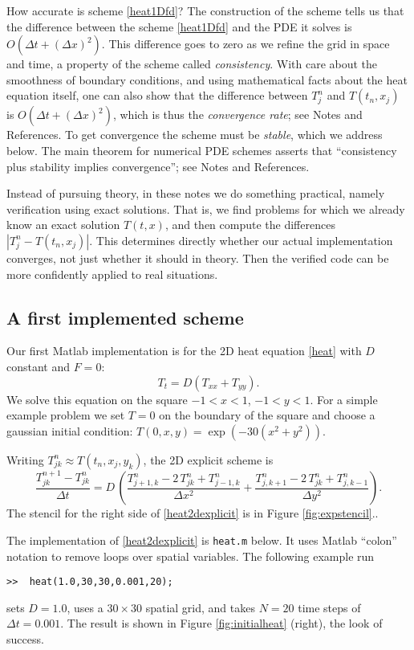 \documentclass[letterpaper,final,12pt,reqno]{amsart}
\begin{document}
How accurate is scheme \eqref{heat1Dfd}?  The construction of the scheme tells us that the difference between the scheme \eqref{heat1Dfd} and the PDE it solves is $O(\Delta t + (\Delta x)^2)$.  This difference goes to zero as we refine the grid in space and time, a property of the scheme called \emph{consistency}.  With care about the smoothness of boundary conditions, and using mathematical facts about the heat equation itself, one can also show that the difference between $T_j^n$ and $T(t_n,x_j)$ is $O(\Delta t + (\Delta x)^2)$, which is thus the \emph{convergence rate}; see Notes and References.  To get convergence the scheme must be \emph{stable}, which we address below.  The main theorem for numerical PDE schemes asserts that ``consistency plus stability implies convergence''; see Notes and References.

Instead of pursuing theory, in these notes we do something practical, namely verification using exact solutions.  That is, we find problems for which we already know an exact solution $T(t,x)$, and then compute the differences $|T_j^n - T(t_n,x_j)|$.  This determines directly whether our actual implementation converges, not just whether it should in theory.  Then the verified code can be more confidently applied to real situations.

\subsection*{A first implemented scheme}  Our first Matlab implementation is for the 2D heat equation \eqref{heat} with $D$ constant and $F=0$:
\begin{equation}
T_t = D (T_{xx}+T_{yy}).\label{heat2D}
\end{equation}
We solve this equation on the square $-1 < x < 1$, $-1 < y < 1$.  For a simple example problem we set $T=0$ on the boundary of the square and choose a gaussian initial condition: $T(0,x,y) = \exp(-30 (x^2+y^2))$.

Writing $T_{jk}^n \approx T(t_n,x_j,y_k)$, the 2D explicit scheme is
\begin{equation}
	\frac{T_{jk}^{n+1} - T_{jk}^n}{\Delta t} = D\,\left(\frac{T_{j+1,k}^n - 2\, T_{jk}^n + T_{j-1,k}^n}{\Delta x^2} + \frac{T_{j,k+1}^n - 2\, T_{jk}^n + T_{j,k-1}^n}{\Delta y^2}\right). \label{heat2dexplicit}
\end{equation}
The stencil for the right side of \eqref{heat2dexplicit} is in Figure \ref{fig:expstencil}..

The implementation of \eqref{heat2dexplicit} is \texttt{heat.m} below.  It uses Matlab ``colon'' notation to remove loops over spatial variables.  The following example run
\begin{Verbatim}
>>  heat(1.0,30,30,0.001,20);
\end{Verbatim}
sets $D=1.0$, uses a $30\times 30$ spatial grid, and takes $N=20$ time steps of $\Delta t = 0.001$.  The result is shown in Figure \ref{fig:initialheat} (right), the look of success.
\end{document}
